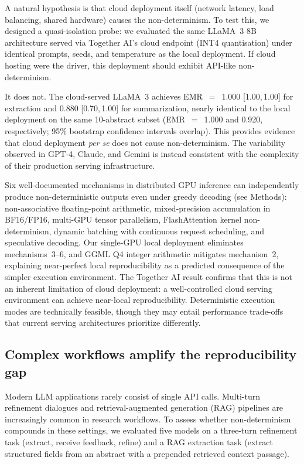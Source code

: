 \documentclass[sn-nature]{sn-jnl}
\begin{document}
A natural hypothesis is that cloud deployment itself (network latency, load balancing, shared hardware) causes the non-determinism.
To test this, we designed a quasi-isolation probe: we evaluated the same LLaMA~3 8B architecture served via Together AI's cloud endpoint (INT4 quantisation) under identical prompts, seeds, and temperature as the local deployment.
If cloud hosting were the driver, this deployment should exhibit API-like non-determinism.

It does not.
The cloud-served LLaMA~3 achieves EMR~$=$~1.000 [1.00,\,1.00] for extraction and 0.880 [0.70,\,1.00] for summarization, nearly identical to the local deployment on the same 10-abstract subset (EMR~$=$~1.000 and 0.920, respectively; 95\% bootstrap confidence intervals overlap).
This provides evidence that cloud deployment \emph{per se} does not cause non-determinism. The variability observed in GPT-4, Claude, and Gemini is instead consistent with the complexity of their production serving infrastructure.

Six well-documented mechanisms in distributed GPU inference can independently produce non-deterministic outputs even under greedy decoding (see Methods): non-associative floating-point arithmetic\cite{higham2002accuracy}, mixed-precision accumulation in BF16/FP16\cite{yuan2025nondeterminism}, multi-GPU tensor parallelism\cite{shoeybi2019megatron}, FlashAttention kernel non-determinism\cite{dao2022flashattention}, dynamic batching with continuous request scheduling\cite{kwon2023vllm}, and speculative decoding\cite{leviathan2023speculative}.
Our single-GPU local deployment eliminates mechanisms~3--6, and GGML Q4 integer arithmetic mitigates mechanism~2, explaining near-perfect local reproducibility as a predicted consequence of the simpler execution environment.
The Together AI result confirms that this is not an inherent limitation of cloud deployment: a well-controlled cloud serving environment can achieve near-local reproducibility.
Deterministic execution modes are technically feasible, though they may entail performance trade-offs that current serving architectures prioritize differently.


\subsection{Complex workflows amplify the reproducibility gap}\label{subsec:multiturn}

Modern LLM applications rarely consist of single API calls.
Multi-turn refinement dialogues and retrieval-augmented generation (RAG) pipelines are increasingly common in research workflows.
To assess whether non-determinism compounds in these settings, we evaluated five models on a three-turn refinement task (extract, receive feedback, refine) and a RAG extraction task (extract structured fields from an abstract with a prepended retrieved context passage).
\end{document}
